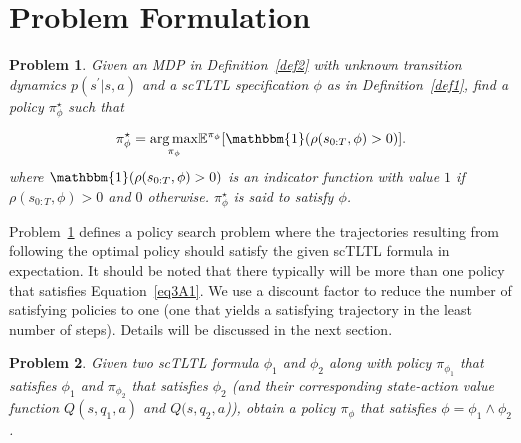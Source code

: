 \documentclass{article}
\newtheorem{problem}{Problem}
\begin{document}


\section{Problem Formulation}
\label{sec:problem}

\begin{problem}\label{p1}
Given an MDP in Definition~\ref{def2} with unknown transition dynamics $p(s^\prime|s,a)$ and a scTLTL specification $\phi$ as in Definition~\ref{def1}, find a policy $\pi^\star_\phi$ such that


\begin{equation}\label{eq3A1}
\pi^\star_\phi = \underset{\pi_\phi}{\arg \max}\mathbb{E}^{\pi_\phi}[\mathbbm{1}(\rho(s_{0:T}, \phi)>0)]. 
\end{equation}
\noindent where $\mathbbm{1}(\rho(s_{0:T}, \phi)>0)$  is an indicator function with value $1$ if $\rho(s_{0:T}, \phi)>0$ and $0$ otherwise. $\pi^\star_\phi$ is said to satisfy $\phi$.
\end{problem}

\noindent Problem~\ref{p1} defines a policy search problem where the trajectories resulting from following the optimal policy should satisfy the given scTLTL formula in expectation. It should be noted that there typically will be more than one policy that satisfies Equation~\eqref{eq3A1}. We use a discount factor to reduce the number of satisfying policies to one (one that yields a satisfying trajectory in the least number of steps). Details will be discussed in the next section.



\begin{problem} \label{p2}
Given two scTLTL formula $\phi_1$ and $\phi_2$ along with policy $\pi_{\phi_1}$ that satisfies $\phi_1$ and $\pi_{\phi_2}$ that satisfies $\phi_2$ (and their corresponding state-action value function $Q(s,q_1,a)$ and $Q(s,q_2,a$)), obtain a policy $\pi_{\phi}$ that satisfies $\phi=\phi_1 \wedge \phi_2$. 
\end{problem}
\end{document}
